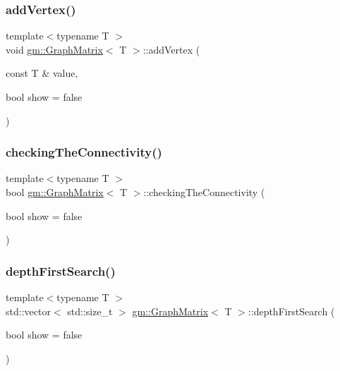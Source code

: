 \subsubsection{\texorpdfstring{add\+Vertex()}{addVertex()}}
{\footnotesize\ttfamily template$<$typename T $>$ \\
void \mbox{\hyperlink{classgm_1_1_graph_matrix}{gm\+::\+Graph\+Matrix}}$<$ T $>$\+::add\+Vertex (\begin{DoxyParamCaption}\item[{const T \&}]{value,  }\item[{bool}]{show = {\ttfamily false} }\end{DoxyParamCaption})}

\mbox{\label{classgm_1_1_graph_matrix_ab91a8713c4e8ed19bedc58f1cfab2bc5}} 
\subsubsection{\texorpdfstring{checking\+The\+Connectivity()}{checkingTheConnectivity()}}
{\footnotesize\ttfamily template$<$typename T $>$ \\
bool \mbox{\hyperlink{classgm_1_1_graph_matrix}{gm\+::\+Graph\+Matrix}}$<$ T $>$\+::checking\+The\+Connectivity (\begin{DoxyParamCaption}\item[{bool}]{show = {\ttfamily false} }\end{DoxyParamCaption})}

\mbox{\label{classgm_1_1_graph_matrix_a91506a78cf2efe32f6c48a7f12914a43}} 
\subsubsection{\texorpdfstring{depth\+First\+Search()}{depthFirstSearch()}}
{\footnotesize\ttfamily template$<$typename T $>$ \\
std\+::vector$<$ std\+::size\+\_\+t $>$ \mbox{\hyperlink{classgm_1_1_graph_matrix}{gm\+::\+Graph\+Matrix}}$<$ T $>$\+::depth\+First\+Search (\begin{DoxyParamCaption}\item[{bool}]{show = {\ttfamily false} }\end{DoxyParamCaption})}

